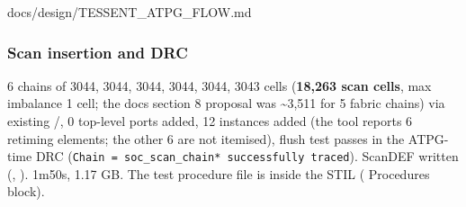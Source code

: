 \begin{relocated}{docs/design/TESSENT_ATPG_FLOW.md}
\subsubsection{Scan insertion and DRC}\label{tm:flow:tessent-atpg:41-scan-insertion-and-drc}

6 chains of 3044, 3044, 3044, 3044, 3044, 3043 cells (\textbf{18,263
scan cells}, max imbalance 1 cell; the doc\textquotesingle s section 8
proposal was \textasciitilde3,511 for 5 fabric chains) via existing
/, 0 top-level ports added,
12 instances added (the tool reports 6 retiming elements; the other 6
are not itemised), flush test passes in the ATPG-time DRC
(\texttt{Chain\ =\allowbreak{}\ soc\_\allowbreak{}scan\_\allowbreak{}chain*\ successfully\ traced}).
ScanDEF written (,
). 1m50s, 1.17 GB. The test procedure file is
inside the STIL ( Procedures block).

{\footnotesize\setlength{\tabcolsep}{3pt}

}
\end{relocated}
